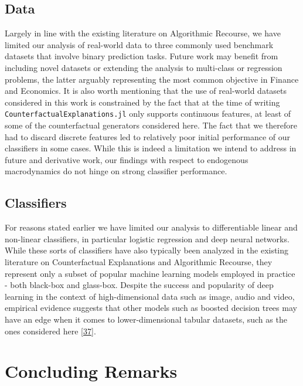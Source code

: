 \documentclass[
  conference]{IEEEtran}
\begin{document}
\hypertarget{sec-limit-data}{%
\subsection{Data}\label{sec-limit-data}}

Largely in line with the existing literature on Algorithmic Recourse, we
have limited our analysis of real-world data to three commonly used
benchmark datasets that involve binary prediction tasks. Future work may
benefit from including novel datasets or extending the analysis to
multi-class or regression problems, the latter arguably representing the
most common objective in Finance and Economics. It is also worth
mentioning that the use of real-world datasets considered in this work
is constrained by the fact that at the time of writing
\texttt{CounterfactualExplanations.jl} only supports continuous
features, at least of some of the counterfactual generators considered
here. The fact that we therefore had to discard discrete features led to
relatively poor initial performance of our classifiers in some cases.
While this is indeed a limitation we intend to address in future and
derivative work, our findings with respect to endogenous macrodynamics
do not hinge on strong classifier performance.

\hypertarget{classifiers}{%
\subsection{Classifiers}\label{classifiers}}

For reasons stated earlier we have limited our analysis to
differentiable linear and non-linear classifiers, in particular logistic
regression and deep neural networks. While these sorts of classifiers
have also typically been analyzed in the existing literature on
Counterfactual Explanations and Algorithmic Recourse, they represent
only a subset of popular machine learning models employed in practice -
both black-box and glass-box. Despite the success and popularity of deep
learning in the context of high-dimensional data such as image, audio
and video, empirical evidence suggests that other models such as boosted
decision trees may have an edge when it comes to lower-dimensional
tabular datasets, such as the ones considered here
\protect\hyperlink{ref-grinsztajn2022tree}{{[}37{]}}.

\hypertarget{sec-conclusion}{%
\section{Concluding Remarks}\label{sec-conclusion}}
\end{document}
